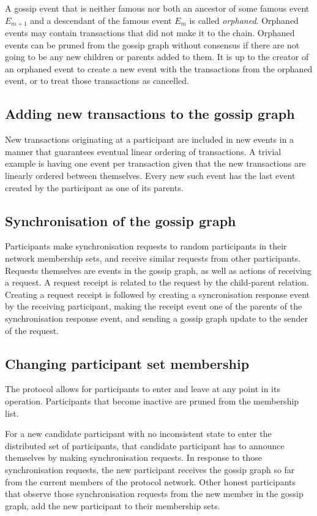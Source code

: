 \documentclass[a4paper,11pt]{article}
\begin{document}
A gossip event that is neither famous nor both an ancestor of some famous event $E_{m+1}$ and a
descendant of the famous event $E_m$ is called \emph{orphaned}. Orphaned events may contain
transactions that did not make it to the chain. Orphaned events can be pruned from the gossip graph
without consensus if there are not going to be any new children or parents added to them. It is up
to the creator of an orphaned event to create a new event with the transactions from the orphaned
event, or to treat those transactions as cancelled.


\subsection{Adding new transactions to the gossip graph}

New transactions originating at a participant are included in new events in a manner that guarantees
eventual linear ordering of transactions. A trivial example is having one event per transaction
given that the new transactions are linearly ordered between themselves. Every new such event has
the last event created by the participant as one of its parents.


\subsection{Synchronisation of the gossip graph}

Participants make synchronisation requests to random participants in their network membership sets,
and receive similar requests from other participants. Requests themselves are events in the gossip
graph, as well as actions of receiving a request. A request receipt is related to the request by the
child-parent relation. Creating a request receipt is followed by creating a syncronisation response
event by the receiving participant, making the receipt event one of the parents of the
synchronisation response event, and sending a gossip graph update to the sender of the request.


\subsection{Changing participant set membership}

The protocol allows for participants to enter and leave at any point in its operation. Participants
that become inactive are pruned from the membership list.

For a new candidate participant with no inconsistent state to enter the distributed set of
participants, that candidate participant has to announce themselves by making synchronisation
requests. In response to those synchronisation requests, the new participant receives the gossip
graph so far from the current members of the protocol network. Other honest participants that
observe those synchronisation requests from the new member in the gossip graph, add the new
participant to their membership sets.
\end{document}
